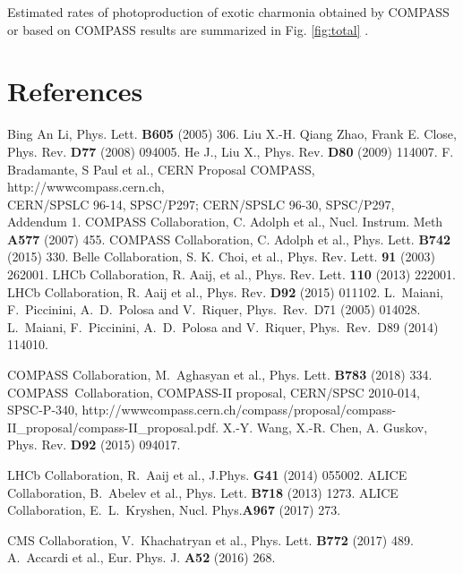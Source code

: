 \documentclass[a4paper]{jpconf}
\begin{document}
Estimated rates of photoproduction of exotic charmonia obtained by COMPASS or based on COMPASS results are summarized in Fig. \ref{fig:total} \cite{Zc,Z4200,Aghasyan:2018vuq}.

\section*{References}
\begin{thebibliography}{9}
 Bing An Li,  Phys. Lett. \textbf{B605} (2005) 306.
 Liu X.-H. Qiang Zhao, Frank E. Close, Phys. Rev. \textbf{D77} (2008) 094005.
 He J., Liu X., Phys. Rev. \textbf{D80} (2009) 114007.
 F. Bradamante, S Paul et al., CERN Proposal COMPASS,
      http://wwwcompass.cern.ch,\\ CERN/SPSLC 96-14, SPSC/P297; CERN/SPSLC 96-30, SPSC/P297,
     Addendum 1.
 COMPASS Collaboration, C. Adolph et al., 	Nucl. Instrum. Meth \textbf{A577} (2007) 455.
 COMPASS Collaboration, C. Adolph et al.,  Phys. Lett. \textbf{B742} (2015) 330.
Belle Collaboration, S. K. Choi, et al.,  Phys. Rev. Lett. \textbf{91} (2003) 262001.
 LHCb Collaboration, R. Aaij, et al., Phys. Rev. Lett. \textbf{110}  (2013) 222001.
 LHCb Collaboration, R. Aaij et al., Phys. Rev. \textbf{D92} (2015) 011102.
  L.~Maiani, F.~Piccinini, A.~D.~Polosa and V.~Riquer,
  Phys.\ Rev.\ D71 (2005) 014028.
  L.~Maiani, F.~Piccinini, A.~D.~Polosa and V.~Riquer,
  Phys.\ Rev.\ D89 (2014) 114010.

 COMPASS Collaboration, M.~Aghasyan et al., Phys. Lett. \textbf {B783} (2018) 334.
 COMPASS~Collaboration, COMPASS-II proposal, CERN/SPSC 2010-014, SPSC-P-340,     
\mbox{http://wwwcompass.cern.ch/compass/proposal/compass-II\_proposal/compass-II\_proposal.pdf}.
X.-Y. Wang, X.-R. Chen, A. Guskov, Phys. Rev. \textbf{D92} (2015) 094017.

 LHCb Collaboration, R.~Aaij et al.,
  J.Phys. {\bf G41} (2014) 055002.
 ALICE Collaboration, B.~Abelev et al.,
  Phys. Lett. {\bf B718} (2013) 1273.
 ALICE Collaboration,  E.~L.~Kryshen,
  Nucl. Phys.{\bf A967} (2017) 273.
  
CMS Collaboration,  V.~Khachatryan et al.,
  Phys. Lett. {\bf B772} (2017) 489.
  A.~Accardi et al.,
  Eur. Phys. J.  {\bf A52} (2016)  268.
  
\end{thebibliography}
\end{document}
